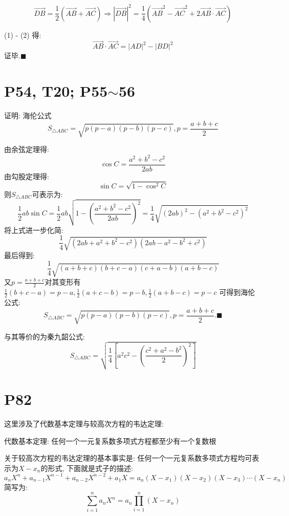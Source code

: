 \documentclass{book}
\begin{document}
        \begin{equation}
            \overrightarrow{DB}=\frac{1}{2} \left ( \overrightarrow{AB}+\overrightarrow{AC} \right )\Longrightarrow |\overrightarrow{DB}|^2=\frac{1}{4}\left ( \overrightarrow{AB}^2-\overrightarrow{AC}^2+2\overrightarrow{AB}\cdot \overrightarrow{AC} \right )
        \end{equation}

        (1) - (2) 得:
        $$
        \overrightarrow{AB}\cdot \overrightarrow{AC}=|AD|^2-|BD|^2
        $$
        证毕.$\blacksquare$
        \section{\textcolor[rgb]{0.11,0.65,0.52}{P54, T20; P55$\sim$56}}
        \begin{boxB}
            证明: \textcolor[rgb]{0.38,0.11,0.2}{海伦公式}
            $$S_{\triangle ABC}=\sqrt{p(p-a)(p-b)(p-c)},p=\frac{a+b+c}{2}$$
        \end{boxB}
        由余弦定理得:
        $$\cos C=\frac{a^2+b^2-c^2}{2ab}$$
        由勾股定理得:
        $$\sin C = \sqrt{1-\cos^2 C}$$
        则$S_{\triangle ABC}$可表示为:
        $$\frac{1}{2}ab\sin C=\frac{1}{2}ab\sqrt{1-\left( \frac{a^2+b^2-c^2}{2ab}\right)^2}=\frac{1}{4}\sqrt{\left(2ab\right)^2-\left( a^2+b^2-c^2 \right)^2}$$
        将上式进一步化简:
        $$\frac{1}{4}\sqrt{\left( 2ab+a^2+b^2-c^2 \right)\left( 2ab-a^2-b^2+c^2 \right)}$$
        最后得到:
        $$\frac{1}{4}\sqrt{\left( a+b+c \right)\left( b+c-a \right)\left( c+a-b \right)\left( a+b-c \right)}$$
        又$\displaystyle p=\frac{a+b+c}{2}$对其变形有$\displaystyle \frac{1}{2}(b+c-a)=p-a,\frac{1}{2}(a+c-b)=p-b,\frac{1}{2}(a+b-c)=p-c$
        可得到海伦公式:
        $$
        S_{\triangle ABC}=\sqrt{p(p-a)(p-b)(p-c)},p=\frac{a+b+c}{2} .\blacksquare
        $$
        
        与其等价的为\textcolor[rgb]{0.38,0.11,0.2}{秦九韶公式}: 
        $$S_{\triangle ABC}=\sqrt{\frac{1}{4}\left[ a^2c^2-\left( \frac{c^2+a^2-b^2}{2} \right)^2 \right]}$$
        \section{\textcolor[rgb]{0.11,0.65,0.52}{P82}}
        这里涉及了\textcolor[rgb]{0.38,0.11,0.2}{代数基本定理}与\textcolor[rgb]{0.38,0.11,0.2}{较高次方程的韦达定理}:
        \begin{boxB}
            代数基本定理: 任何一个一元复系数多项式方程都至少有一个复数根
        \end{boxB}
        关于较高次方程的韦达定理的基本事实是: 任何一个一元复系数多项式方程均可表示为$X-x_n$的形式, 下面就是式子的描述:
        $$a_nX^n+a_{n-1}X^{n-1}+a_{n-2}X^{n-2}+a_1X=a_n(X-x_1)(X-x_2)(X-x_3)\cdots (X-x_n)$$
        简写为:
        $$\sum_{i=1}^{n} a_nX^{n}=a_n\prod_{i=1}^{n}\left ( X-x_n \right ) $$
\end{document}
